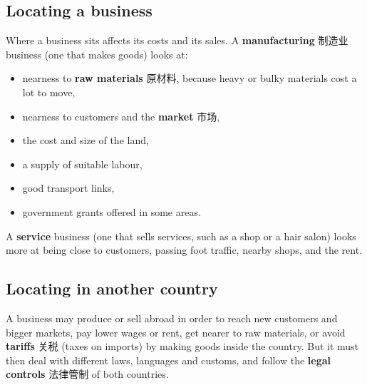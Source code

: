 \documentclass[11pt]{article}
\begin{document}
\subsection*{Locating a business}

Where a business sits affects its costs and its sales. A \textbf{manufacturing} 制造业 business (one that makes goods) looks at:

\begin{itemize}
\item nearness to \textbf{raw materials} 原材料, because heavy or bulky materials cost a lot to move,

\item nearness to customers and the \textbf{market} 市场,

\item the cost and size of the land,

\item a supply of suitable labour,

\item good transport links,

\item government grants offered in some areas.

\end{itemize}

A \textbf{service} business (one that sells services, such as a shop or a hair salon) looks more at being close to customers, passing foot traffic, nearby shops, and the rent.

\subsection*{Locating in another country}

A business may produce or sell abroad in order to reach new customers and bigger markets, pay lower wages or rent, get nearer to raw materials, or avoid \textbf{tariffs} 关税 (taxes on imports) by making goods inside the country. But it must then deal with different laws, languages and customs, and follow the \textbf{legal controls} 法律管制 of both countries.
\end{document}
